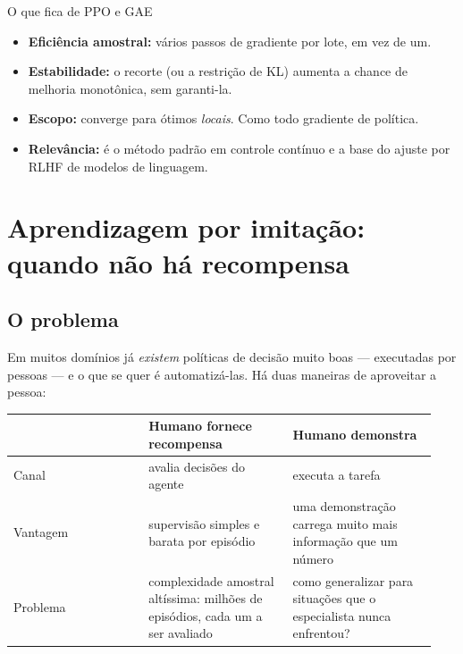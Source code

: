 \documentclass[11pt]{article}
\begin{document}
\begin{defbox}{O que fica de PPO e GAE}
\begin{itemize}
  \item \textbf{Eficiência amostral:} vários passos de gradiente por lote, em vez de um.
  \item \textbf{Estabilidade:} o recorte (ou a restrição de KL) aumenta a chance de
    melhoria monotônica, sem garanti-la.
  \item \textbf{Escopo:} converge para ótimos \emph{locais}. Como todo gradiente de
    política.
  \item \textbf{Relevância:} é o método padrão em controle contínuo e a base do
    ajuste por RLHF de modelos de linguagem.
\end{itemize}
\end{defbox}

\section{Aprendizagem por imitação: quando não há recompensa}

\subsection{O problema}

Em muitos domínios já \emph{existem} políticas de decisão muito boas --- executadas por
pessoas --- e o que se quer é automatizá-las. Há duas maneiras de aproveitar a pessoa:

\begin{center}\small
\begin{tabular}{@{}>{\raggedright\arraybackslash}p{0.30\linewidth}
                 >{\raggedright\arraybackslash}p{0.32\linewidth}
                 >{\raggedright\arraybackslash}p{0.32\linewidth}@{}}
\toprule
 & \textbf{Humano fornece recompensa} & \textbf{Humano demonstra} \\
\midrule
Canal & avalia decisões do agente & executa a tarefa \\
Vantagem & supervisão simples e barata por episódio & uma demonstração carrega muito mais informação que um número \\
Problema & complexidade amostral altíssima: milhões de episódios, cada um a ser avaliado &
  como generalizar para situações que o especialista nunca enfrentou? \\
\bottomrule
\end{tabular}
\end{center}
\end{document}
